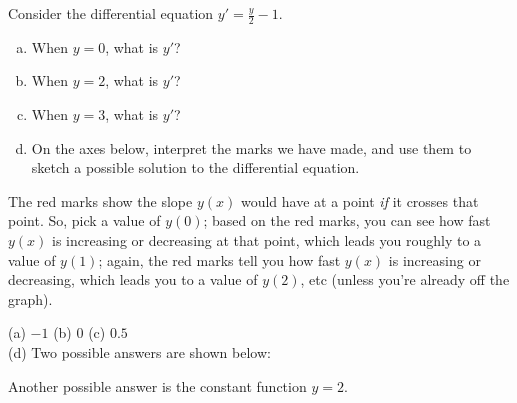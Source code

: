 \begin{Mquestion}\label{prob_s2.4:field}
Consider the differential equation $y'=\frac{y}{2}-1$.
\begin{enumerate}[(a)]
\item When $y=0$, what is $y'$?
\item When $y=2$, what is $y'$?
\item When $y=3$, what is $y'$?
\item\label{prob_s2.4:fieldd} On the axes below, interpret the marks we have made, and use them to sketch a possible solution to the differential equation.
\end{enumerate}
\begin{center}
\end{center}
\end{Mquestion}
\begin{hint}
The red marks show the slope $y(x)$ would have at a point \emph{if} it crosses that point. So, pick a value of $y(0)$; based on the red marks, you can see how fast $y(x)$ is increasing or decreasing at that point, which leads you roughly to a value of $y(1)$; again, the red marks tell you how fast $y(x)$ is increasing or decreasing, which leads you to a value of $y(2)$, etc (unless you're already off the graph).
\end{hint}
\begin{answer}
(a) $-1$ \qquad (b) $0$ \qquad (c) $0.5$\\
(d) Two possible answers are shown below:
\begin{center}
\hfill
{}
\end{center}
Another possible answer is the constant function $y=2$.
\end{answer}
